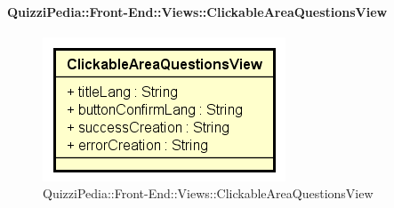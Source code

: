 \paragraph{QuizziPedia::Front-End::Views::ClickableAreaQuestionsView}
\begin{figure} [ht]
	\centering
	\includegraphics[scale=0.45]{UML/Classi/Front-End/QuizziPedia_Front-end_ClickableAreaQuestionsView.png}
	\caption{QuizziPedia::Front-End::Views::ClickableAreaQuestionsView}
\end{figure} \FloatBarrier
